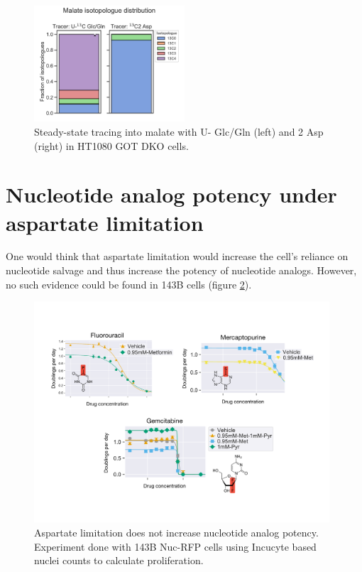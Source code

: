 \begin{figure}[ht]
    \centering
    \includegraphics[width=0.5\textwidth]{figures/sapp/DKO_char/HT1080_Mal_iso_dist.pdf}
    \caption[\hCi{} Gln/Glc, Asp tracing in HT1080 GOT DKO, Malate.]{
    Steady-state tracing into malate with U-\hCi{} Glc/Gln (left) and \hCi{}2 Asp (right) in HT1080 GOT DKO cells.
    }
    \label{fig:sapp:DKO_char:HT1080_Mal_iso_dist}
\end{figure}




\FloatBarrier
\section{Nucleotide analog potency under aspartate limitation}
One would think that aspartate limitation would increase the cell's reliance on nucleotide salvage and thus increase the potency of nucleotide analogs.
However, no such evidence could be found in 143B cells (figure \ref{fig:sapp:random:nucleotide_analogs}).

\begin{figure}[ht]
    \centering
    \includegraphics[width=0.98\textwidth]{figures/sapp/random/nucleotide_analogs.pdf}
    \caption[Asp limitation does not increase nucleotide analog potency.]{
    Aspartate limitation does not increase nucleotide analog potency.
    Experiment done with 143B Nuc-RFP cells using Incucyte based nuclei counts to calculate proliferation.
    }
    \label{fig:sapp:random:nucleotide_analogs}
\end{figure}




